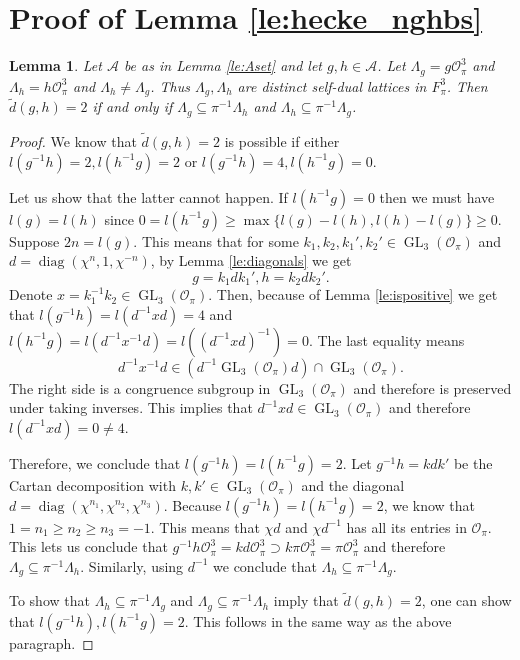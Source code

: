 \documentclass{eptcs}
\newtheorem{lemma}[theorem]{Lemma}
\theoremstyle{remark}
\theoremstyle{definition}
\DeclareMathOperator{\GL}{GL}
\DeclareMathOperator{\diag}{diag}
\begin{document}
\section{Proof of Lemma \ref{le:hecke_nghbs}}
\label{proofoflemma5.4}
\begin{lemma}
  Let $\mathcal{A}$ be as in Lemma \ref{le:Aset} and let $g,h \in \mathcal{A}$.
  Let $\Lambda_{g} = g \mathcal{O}_{\pi}^{3}$ and $\Lambda_{h} = h \mathcal{O}_{\pi}^{3}$ and $\Lambda_{h} \neq \Lambda_{g}$. 
  Thus $\Lambda_{g},\Lambda_{h}$ are distinct self-dual lattices in $F_{\pi}^{3}$.
  Then $\tilde{d}(g,h) = 2$ if and only if $ \Lambda_{g }\subseteq  \pi^{-1}\Lambda_{h}$ and $ \Lambda_{h} \subseteq \pi^{-1} \Lambda_{g}$.
\end{lemma}
\begin{proof}
    We know that $\tilde{d}(g,h)=2$ is possible if either $l(g^{-1}h) =2, l(h^{-1}g)=2$ or $l(g^{-1}h)=4,l(h^{-1}g) = 0$. 
   

    Let us show that the latter cannot happen. If $l(h^{-1} g )=0$ then we must have $l(g)=l(h)$ since $ 0 = l(h^{-1}g) \geq \max\{ l(g) - l(h) , l(h)-l(g) \} \geq 0$. 
   Suppose $2n=l(g)$. 
   This means that for some $k_{1},k_{2},k_{1}',k_{2}' \in \GL_{3}(\mathcal{O}_{\pi})$ and $d = \diag(\chi^{n}, 1, \chi^{-n})$, by Lemma \ref{le:diagonals} we get 
   \begin{equation}
       g =  k_{1} d k_{1}', h = k_{2} d k_{2}'.
       \label{eq:cartan_gh}
   \end{equation}
   Denote $x = k_{1}^{-1} k_{2} \in \GL_{3}(\mathcal{O}_{\pi})$. Then, because of Lemma \ref{le:ispositive} we get that $l(g^{-1}h ) = l(d^{-1} x d) = 4$ and $l(h^{-1} g) = l(d^{-1} x^{-1} d) = l \left( (d^{-1} x d)^{-1}\right) = 0$. The last equality means $$d^{-1} x^{-1} d \in \left( d^{-1}\GL_{3}(\mathcal{O}_{\pi}) d \right) \cap \GL_{3}(\mathcal{O}_{\pi}).$$
   The right side is a congruence subgroup in $\GL_{3}(\mathcal{O}_{\pi})$ and therefore is preserved under taking inverses. This implies that $d^{-1} x d \in \GL_{3}(\mathcal{O}_{\pi})$ and therefore $l(d^{-1} x d) = 0 \neq 4$.


   Therefore, we conclude that $l(g^{-1}h) = l(h^{-1} g ) =2$. Let $ g^{-1} h= kd k'$ be the Cartan decomposition with $k,k' \in \GL_{3}(\mathcal{O}_{\pi})$ and the diagonal $d = \diag(\chi^{n_{1}}, \chi^{n_{2}}, \chi^{n_{3}})$. Because $l(g^{-1}h)=l(h^{-1}g)=2$, we know that $1 = n_{1} \geq n_{2} \geq n_{3} = -1$. This means that $\chi d$ and $\chi d^{-1}$ has all its entries in $\mathcal{O}_{\pi}$.
   This lets us conclude that $ g^{-1}  h \mathcal{O}_{\pi}^{3} = k d \mathcal{O}_{\pi}^{3} \supset k \pi \mathcal{O}_{\pi}^{3} = \pi \mathcal{O}_{\pi}^{3}$ and 
   therefore $ \Lambda_{g} \subseteq  \pi^{-1} \Lambda_{h}$. 
   Similarly, using $d^{-1}$ we conclude that $\Lambda_{h} \subseteq \pi^{-1} \Lambda_{g}$. 

   To show that $\Lambda_{h} \subseteq \pi^{-1} \Lambda_{g}$ and $\Lambda_{g} \subseteq \pi^{-1} \Lambda_{h}$ imply that $\tilde{d}(g,h) =2$, one can show that $l(g^{-1}h), l(h^{-1}g) = 2$. This follows in the same way as the above paragraph. 

\end{proof}
\end{document}
